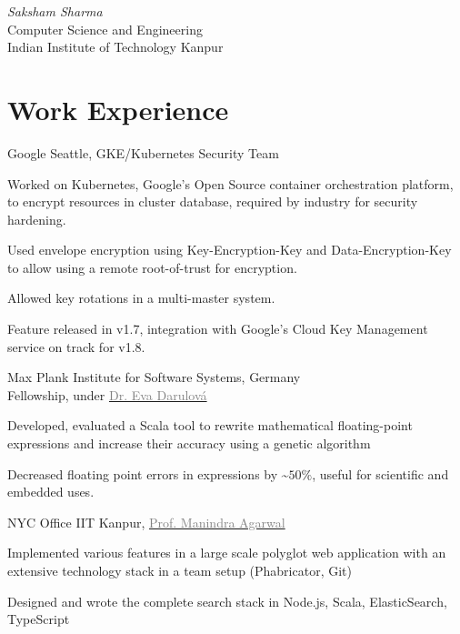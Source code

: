 \documentclass{tccv}
\begin{document}
{ \textit{Saksham \textcolor{myred}{Sharma}}}
\medskip\\
\large{Computer Science and Engineering}\\
{Indian Institute of Technology Kanpur}

\vspace{-0.5cm}
\section{Work Experience}
\begin{experience}
  {Google Seattle, GKE/Kubernetes Security Team}
  {
  \item Worked on Kubernetes, Google's Open Source container orchestration platform, to
    encrypt resources in cluster database, required by industry for security hardening.
  \item Used envelope encryption using Key-Encryption-Key and Data-Encryption-Key to allow
    using a remote root-of-trust for encryption.
  \item Allowed key rotations in a multi-master system.
  \item Feature released in v1.7, integration with Google's Cloud Key Management service
    on track for v1.8.
  }

  {Max Plank Institute for Software Systems, \small{Germany}\\
  Fellowship, under
  \href{http://www.mpi-sws.org/~eva}{\textcolor{gray}{Dr. Eva
      Darulová}}}
  {
  \item Developed, evaluated a Scala tool to rewrite
    mathematical floating-point expressions and increase their
    accuracy using a genetic algorithm
  \item Decreased floating point errors in expressions by
    \~$50\%$, useful for scientific and embedded uses.
  }

  {NYC Office IIT Kanpur,
    \href{http://cse.iitk.ac.in/~manindra}{\textcolor{gray}{Prof. Manindra Agarwal}}}
  {
  \item Implemented various features in a large scale polyglot web
    application with an extensive technology stack in a team setup
    (Phabricator, Git)
  \item Designed and wrote the complete search stack in Node.js, Scala, ElasticSearch, TypeScript
  }
\end{experience}
\end{document}
